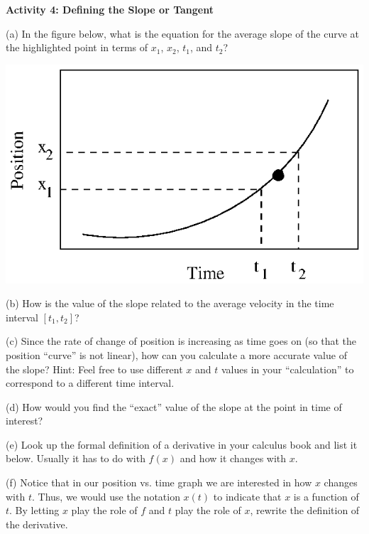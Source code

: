 \textbf{Activity 4: Defining the Slope or Tangent} 

(a) In the figure below, what is the equation for the average slope of the curve
at the highlighted point in terms of \( x_{1} \), \( x_{2} \), \( t_{1} \),
and \( t_{2} \)?

\vspace{0.3cm}
{\par\raggedright \includegraphics{equations/equations_fig2.eps} \par}
\vspace{0.3cm}

(b) How is the value of the slope related to the average velocity in the time
interval 
$[t_1,t_2]$?
\vspace{10mm}

(c) Since the rate of change of position is increasing as time goes on (so that
the position ``curve'' is not linear), how can you calculate
a more accurate value of the slope? Hint: Feel free to use different $x$ and 
$t$
values in your ``calculation'' to correspond to a different
time interval.
\vspace{20mm}

(d) How would you find the ``exact'' value of the slope at the
point in time of interest?
\vspace{20mm}

(e) Look up the formal definition of a derivative in your calculus book and
list it below. Usually it has to do with $f(x)$ and how it changes with $x$.
\vspace{20mm}

(f) Notice that in our position vs. time graph we are interested in how $x$ 
changes
with $t$. Thus, we would use the notation $x(t)$ to indicate that 
$x$ is a function
of $t$. By letting $x$ play the role of $f$ and $t$ play the role of 
$x$, rewrite the
definition of the derivative.
\vspace{20mm}

